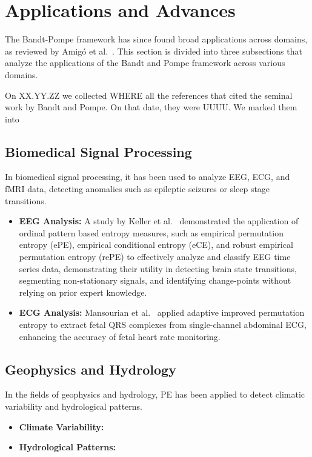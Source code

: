 \section{Applications and Advances}

The Bandt-Pompe framework has since found broad applications across domains, as reviewed by Amigó et al.~\cite{amigo2023ordinal}. 
This section is divided into three subsections that analyze the applications of the Bandt and Pompe framework across various domains.

On XX.YY.ZZ we collected WHERE all the references that cited the seminal work by Bandt and Pompe.
On that date, they were UUUU.
We marked them into 

\subsection{Biomedical Signal Processing}
In biomedical signal processing, it has been used to analyze EEG, ECG, and fMRI data, detecting anomalies such as epileptic seizures or sleep stage transitions. 
\begin{itemize}
	\item \textbf{EEG Analysis:} A study by Keller et al.~\cite{Keller2014} demonstrated the application of ordinal pattern based entropy measures, such as empirical permutation entropy (ePE), empirical conditional entropy (eCE), and robust empirical permutation entropy (rePE) to effectively analyze and classify EEG time series data, demonstrating their utility in detecting brain state transitions, segmenting non-stationary signals, and identifying change-points without relying on prior expert knowledge.
	
	\item \textbf{ECG Analysis:} Mansourian et al.~\cite{Mansourian2024} applied adaptive improved permutation entropy to extract fetal QRS complexes from single-channel abdominal ECG, enhancing the accuracy of fetal heart rate monitoring.
\end{itemize}

\subsection{Geophysics and Hydrology}
In the fields of geophysics and hydrology, PE has been applied to detect climatic variability and hydrological patterns.
\begin{itemize}
	\item \textbf{Climate Variability:}
	
	\item \textbf{Hydrological Patterns:}
\end{itemize}

